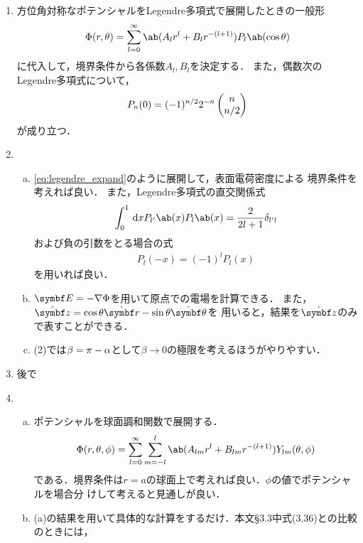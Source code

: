\begin{enumerate}[label={\large 3.\arabic*}]
  \item 方位角対称なポテンシャルをLegendre多項式で展開したときの一般形
    \begin{gather}%
      \label{eq:legendre_expand}
      \Phi(r,\theta) = \sum_{l=0}^\infty \ab(A_l r^l + B_l r^{-(l+1)}) P_l\ab(\cos\theta)
    \end{gather}%
    に代入して，境界条件から各係数$A_l ,B_l$を決定する．
    また，偶数次のLegendre多項式について，
    \begin{gather}%
      P_n(0) = (-1)^{n/2} 2^{-n} \comb{n}{n/2}
    \end{gather}
    が成り立つ．
  \item 
    \begin{enumerate}[(a)]%
      \item  
        \eqref{eq:legendre_expand}のように展開して，表面電荷密度による
        境界条件を考えれば良い．
        また，Legendre多項式の直交関係式
        \begin{gather}%
          \int_0^1 \dl{x} P_{l'}\ab(x) P_l\ab(x) = \frac{2}{2l+1} \delta_{l'l}
        \end{gather}%
        および負の引数をとる場合の式
        \begin{gather}%
          P_l(-x) =  (-1)^l P_l(x)
        \end{gather}%
        を用いれば良い．
      \item $\bs{E} = -\gr \Phi$を用いて原点での電場を計算できる．
        また，$\hat{\bs{z}} = \cos\theta \hat{\bs{r}} - \sin\theta \hat{\bs{\theta}}$を
        用いると，結果を$\hat{\bs{z}}$のみで表すことができる．
      \item (2)では$\beta = \pi - \alpha$として$\beta \to 0$の極限を考えるほうがやりやすい．
    \end{enumerate}
  \item 後で
  \item 
    \begin{enumerate}[(a)]%
      \item  ポテンシャルを球面調和関数で展開する．
        \begin{gather}%
          \Phi(r,\theta,\phi) = \sum_{l=0}^\infty \sum_{m=-l}^{l} \ab(A_{lm} r^l + B_{lm}r^{-(l+1)}) Y_{lm}(\theta,\phi)
        \end{gather}%
        である．境界条件は$r=a$の球面上で考えれば良い．$\phi$の値でポテンシャルを場合分
        けして考えると見通しが良い．
      \item (a)の結果を用いて具体的な計算をするだけ．本文\S3.3中式(3.36)との比較のときには，

\end{enumerate}
\end{enumerate}
